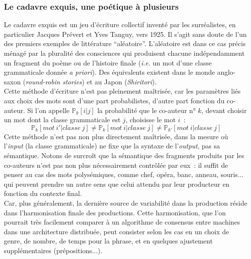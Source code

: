 \documentclass{article}
\begin{document}
			\subsubsection{Le cadavre exquis, une poétique à plusieurs}
				Le cadavre exquis est un jeu d'écriture collectif inventé par les surréalistes, en particulier Jacques Prévert et Yves Tanguy, vers 1925. Il s'agit sans doute de l'un des premiers exemples de littérature ``aléatoire''. L'aléatoire est dans ce cas précis ménagé par la pluralité des consciences qui produisent chacune indépendamment un fragment du poème ou de l'histoire finale (\textit{i.e.} un mot d'une classe grammaticale donnée \textit{a priori}). Des équivalents existent dans le monde anglo-saxon (\textit{round-robin stories}) et au Japon (\textit{Shiritori}).\\
				Cette méthode d'écriture n'est pas pleinement maîtrisée, car les paramètres liés aux choix des mots sont d'une part probabilistes, d'autre part fonction du co-auteur. Si l'on appelle $\mathbb{P}_k[i|j]$ la probabilité que le co-auteur n° $k$, devant choisir un mot dont la classe grammaticale est $j$, choisisse le mot $i$~:
				\begin{equation}
					\mathbb{P}_k[mot \ i' | classe \ j] \neq \mathbb{P}_k[mot \ i | classe \ j] \neq \mathbb{P}_{k'}[mot \ i | classe \ j]
				\end{equation}
				Cette méthode n'est pas non plus directement maîtrisée, dans la mesure où l'\textit{input} (la classe grammaticale) ne fixe que la syntaxe de l'\textit{output}, pas sa sémantique. Notons de surcroît que la sémantique des fragments produits par les co-auteurs n'est pas non plus nécessairement contrôlée par eux~: il suffit de penser au cas des mots polysémiques, comme chef, opéra, banc, anneau, souris... qui peuvent prendre un autre sens que celui attendu par leur producteur en fonction du contexte final.\\
				
				Car, plus généralement, la dernière source de variabilité dans la production réside dans l'harmonisation finale des productions. Cette harmonisation, que l'on pourrait très facilement comparer à un algorithme de consensus entre machines dans une architecture distribuée, peut consister selon les cas en un choix de genre, de nombre, de temps pour la phrase, et en quelques ajustement supplémentaires (prépositions...).\\
				
\end{document}
